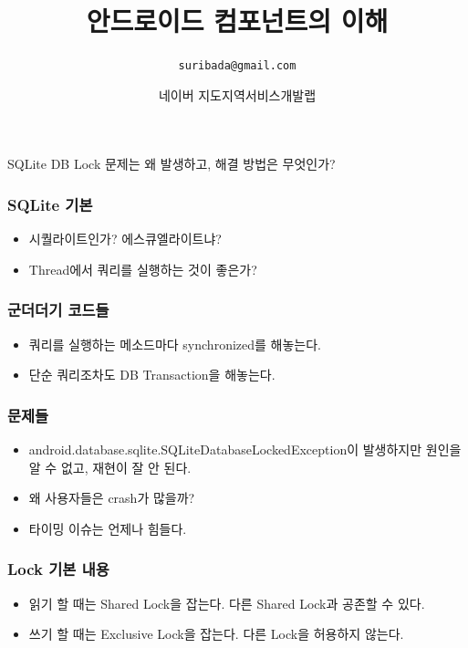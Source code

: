 \documentclass{beamer}
\begin{document}

\title{안드로이드 컴포넌트의 이해}
\author[노재춘]{\texttt{suribada@gmail.com}}
\date[\today]{네이버 지도지역서비스개발랩}

\begin{frame}
\titlepage
\end{frame}

\begin{frame}
SQLite DB Lock 문제는 왜 발생하고, 해결 방법은 무엇인가?
\end{frame}

\begin{frame}
\frametitle{SQLite 기본}
\begin{itemize}
\item 시퀄라이트인가? 에스큐엘라이트냐?
\item Thread에서 쿼리를 실행하는 것이 좋은가?
\end{itemize}
\end{frame}

\begin{frame}
\frametitle{군더더기 코드들}
\begin{itemize}
\item 쿼리를 실행하는 메소드마다 synchronized를 해놓는다.
\item 단순 쿼리조차도 DB Transaction을 해놓는다.
\end{itemize}
\end{frame}

\begin{frame}
\frametitle{문제들}
\begin{itemize}
\item android.database.sqlite.SQLiteDatabaseLockedException이 발생하지만 원인을 알 수 없고, 재현이 잘 안 된다.
\item 왜 사용자들은 crash가 많을까?
\item 타이밍 이슈는 언제나 힘들다.
\end{itemize}
\end{frame}

\begin{frame}
\frametitle{Lock 기본 내용}
\begin{itemize}
\item 읽기 할 때는 Shared Lock을 잡는다. 다른 Shared Lock과 공존할 수 있다.
\item 쓰기 할 때는 Exclusive Lock을 잡는다. 다른 Lock을 허용하지 않는다.
\end{itemize}
\end{frame}
\end{document}
